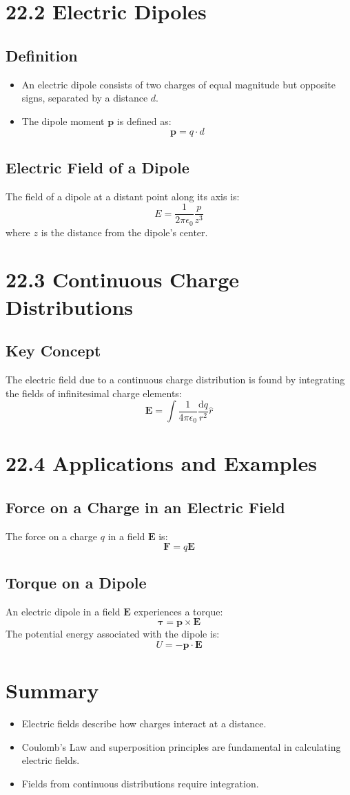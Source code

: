 \documentclass{article}
\begin{document}
\section*{22.2 Electric Dipoles}
\subsection*{Definition}
\begin{itemize}
    \item An electric dipole consists of two charges of equal magnitude but opposite signs, separated by a distance \( d \).
    \item The dipole moment \( \mathbf{p} \) is defined as:
    \[
    \mathbf{p} = q \cdot d
    \]
\end{itemize}

\subsection*{Electric Field of a Dipole}
The field of a dipole at a distant point along its axis is:
\[
E = \frac{1}{2 \pi \epsilon_0} \frac{p}{z^3}
\]
where \( z \) is the distance from the dipole's center.

\section*{22.3 Continuous Charge Distributions}
\subsection*{Key Concept}
The electric field due to a continuous charge distribution is found by integrating the fields of infinitesimal charge elements:
\[
\mathbf{E} = \int \frac{1}{4 \pi \epsilon_0} \frac{\mathrm{d}q}{r^2} \hat{r}
\]

\section*{22.4 Applications and Examples}
\subsection*{Force on a Charge in an Electric Field}
The force on a charge \( q \) in a field \( \mathbf{E} \) is:
\[
\mathbf{F} = q \mathbf{E}
\]

\subsection*{Torque on a Dipole}
An electric dipole in a field \( \mathbf{E} \) experiences a torque:
\[
\boldsymbol{\tau} = \mathbf{p} \times \mathbf{E}
\]
The potential energy associated with the dipole is:
\[
U = -\mathbf{p} \cdot \mathbf{E}
\]

\section*{Summary}
\begin{itemize}
    \item Electric fields describe how charges interact at a distance.
    \item Coulomb’s Law and superposition principles are fundamental in calculating electric fields.
    \item Fields from continuous distributions require integration.
\end{itemize}
\end{document}
